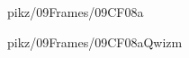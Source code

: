 \documentclass[9pt,xcolor={svgnames, x11names}]{beamer}
\begin{document}

\begin{frame}{pikz/09Frames/09CF08a}
  
\end{frame}


\begin{frame}{pikz/09Frames/09CF08aQwizm}
  
\end{frame}



\end{document}
